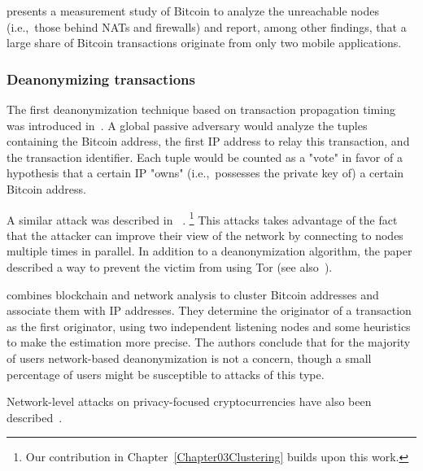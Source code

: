\cite{Wang2017} presents a measurement study of Bitcoin to analyze the unreachable nodes (i.e.,~those behind NATs and firewalls) and report, among other findings, that a large share of Bitcoin transactions originate from only two mobile applications.


\subsubsection*{Deanonymizing transactions}

The first deanonymization technique based on transaction propagation timing was introduced in~\cite{Koshy2014}.
A global passive adversary would analyze the tuples containing the Bitcoin address, the first IP address to relay this transaction, and the transaction identifier.
Each tuple would be counted as a "vote" in favor of a hypothesis that a certain IP "owns" (i.e.,~possesses the private key of) a certain Bitcoin address.

A similar attack was described in ~\cite{Biryukov2014}.
\footnote{Our contribution in Chapter~\ref{Chapter03Clustering} builds upon this work.}
This attacks takes advantage of the fact that the attacker can improve their view of the network by connecting to nodes multiple times in parallel.
In addition to a deanonymization algorithm, the paper described a way to prevent the victim from using Tor (see also~\cite{Biryukov2015}).

\cite{Neudecker2017} combines blockchain and network analysis to cluster Bitcoin addresses and associate them with IP addresses.
They determine the originator of a transaction as the first originator, using two independent listening nodes and some heuristics to make the estimation more precise.
The authors conclude that for the majority of users network-based deanonymization is not a concern, though a small percentage of users might be susceptible to attacks of this type.

Network-level attacks on privacy-focused cryptocurrencies have also been described~\cite{Quesnelle2017, Biryukov2019d, Tramer2020}.

